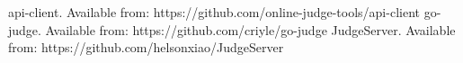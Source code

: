 \documentclass[12pt]{article}
\begin{document}
\begin{enumerate}
\begin{thebibliography}{99}
       api-client. Available from: https://github.com/online-judge-tools/api-client
       go-judge. Available from: https://github.com/criyle/go-judge
       JudgeServer. Available from: https://github.com/helsonxiao/JudgeServer
    \end{thebibliography} 
\end{enumerate}
\end{document}
